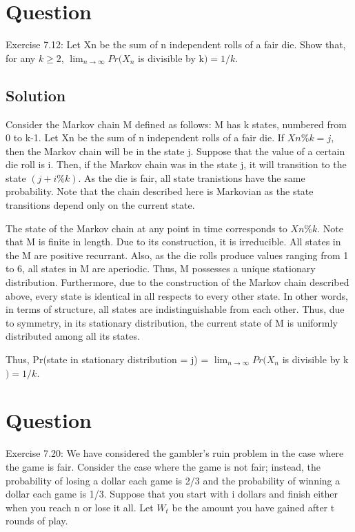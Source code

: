 \documentclass[10pt]{amsart}
\theoremstyle{remark}
\begin{document}
\section{Question}
Exercise 7.12: Let Xn be the sum of n independent rolls of a fair die. Show that, for any $k\geq 2$,
$\lim_{n \to \infty}Pr(X_{n} $ is divisible by k$)=1/k$.

\subsection{Solution}
Consider the Markov chain M defined as follows: M has k states, numbered from 0 to k-1. Let Xn be the sum of n independent rolls of a fair die. If $Xn \% k = j$, then the Markov chain will be in the state j. Suppose that the value of a certain die roll is i. Then, if the Markov chain was in the state j, it will transition to the state $(j+i \% k)$. As the die is fair, all state tranistions have the same probability. Note that the chain described here is Markovian as the state transitions depend only on the current state.

The state of the Markov chain at any point in time corresponds to $Xn \% k$. Note that M is finite in length. Due to its construction, it is irreducible. All states in the M are positive recurrant. Also, as the die rolls produce values ranging from 1 to 6, all states in M are aperiodic. Thus, M possesses a unique stationary distribution. Furthermore, due to the construction of the Markov chain described above, every state is identical in all respects to every other state. In other words, in terms of structure, all states are indistinguishable from each other. Thus, due to symmetry, in its stationary distribution, the current state of M is uniformly distributed among all its states.

Thus, Pr(state in stationary distribution = j) = $\lim_{n \to \infty}Pr(X_{n} $ is divisible by k$)=1/k$.

\section{Question}
Exercise 7.20: We have considered the gambler's ruin problem in the case where the game is fair. Consider the case where the game is not fair; instead, the probability of losing a dollar each game is 2/3 and the probability of winning a dollar each game is 1/3. Suppose that you start with i dollars and finish either when you reach n or lose it all. Let $W_{t}$ be the amount you have gained after t rounds of play.
\end{document}
